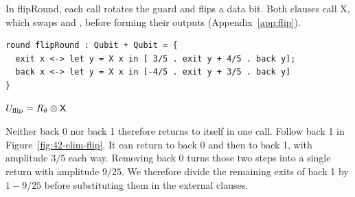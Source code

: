 \documentclass[acmsmall,screen,review,anonymous,nonacm]{acmart}
\newcommand{\storyinlineface}{\small\ttfamily}
\newcommand{\code}[1]{\textnormal{\storyinlineface #1}}
\numberwithin{equation}{section}
\begin{document}
In \code{flipRound}, each call rotates the guard and flips a data bit. Both clauses call
\code{X}, which swaps \code{0} and \code{1}, before forming their outputs (Appendix~\ref{app:flip}).
\par\smallskip\noindent\begin{minipage}[c]{.76\linewidth}
\begin{lstlisting}[xleftmargin=0pt]
round flipRound : Qubit + Qubit = {
  exit x <-> let y = X x in [ 3/5 . exit y + 4/5 . back y];
  back x <-> let y = X x in [-4/5 . exit y + 3/5 . back y]
}
\end{lstlisting}
\end{minipage}\hfill
\begin{minipage}[c]{.22\linewidth}\centering
$U_{\rm flip}=R_\theta\otimes\mathsf X$
\end{minipage}\par\smallskip
Neither \code{back 0} nor \code{back 1} therefore returns to itself in one call.
Follow \code{back 1} in Figure~\ref{fig:42-elim-flip}. It can return to
\code{back 0} and then to \code{back 1}, with amplitude $3/5$ each way.
Removing \code{back 0} turns those two steps into a single return with
amplitude $9/25$. We therefore divide the remaining exits of \code{back 1}
by $1-9/25$ before substituting them in the external clauses.
\end{document}
